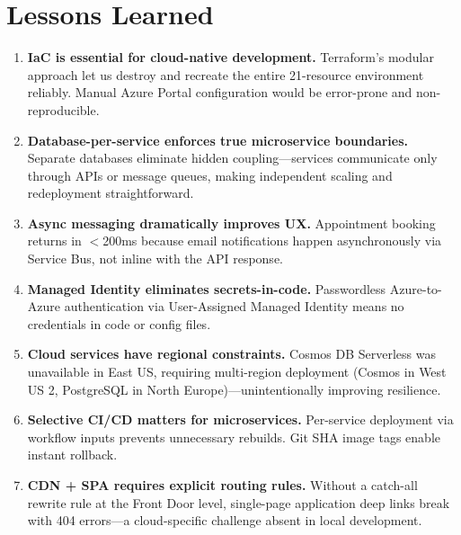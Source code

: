 \documentclass[12pt,a4paper]{article}
\begin{document}
\section{Lessons Learned}

\begin{enumerate}[leftmargin=*]
    \item \textbf{IaC is essential for cloud-native development.} Terraform's modular approach let us destroy and recreate the entire 21-resource environment reliably. Manual Azure Portal configuration would be error-prone and non-reproducible.

    \item \textbf{Database-per-service enforces true microservice boundaries.} Separate databases eliminate hidden coupling---services communicate only through APIs or message queues, making independent scaling and redeployment straightforward.

    \item \textbf{Async messaging dramatically improves UX.} Appointment booking returns in $<$200ms because email notifications happen asynchronously via Service Bus, not inline with the API response.

    \item \textbf{Managed Identity eliminates secrets-in-code.} Passwordless Azure-to-Azure authentication via User-Assigned Managed Identity means no credentials in code or config files.

    \item \textbf{Cloud services have regional constraints.} Cosmos DB Serverless was unavailable in East US, requiring multi-region deployment (Cosmos in West US 2, PostgreSQL in North Europe)---unintentionally improving resilience.

    \item \textbf{Selective CI/CD matters for microservices.} Per-service deployment via workflow inputs prevents unnecessary rebuilds. Git SHA image tags enable instant rollback.

    \item \textbf{CDN + SPA requires explicit routing rules.} Without a catch-all rewrite rule at the Front Door level, single-page application deep links break with 404 errors---a cloud-specific challenge absent in local development.
\end{enumerate}
\end{document}

